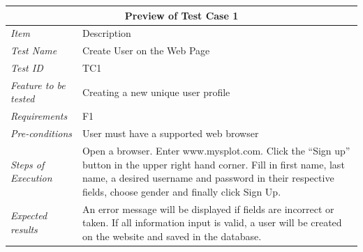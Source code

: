 %
\begin{minipage}{\linewidth}
\setlength{\tabcolsep}{15pt}
\centering
{}
\begin{tabular}{ |l|p{70mm}| }
	\hline
	\multicolumn{2}{|c|}{\cellcolor{gray!25} \textbf{Preview of Test Case 1}} \\
	\hline
	\it{\cellcolor{gray!25}Item} & {\cellcolor{gray!25} Description } \\
	\hline
	\it{\cellcolor{gray!25}Test Name } & Create User on the Web Page \\ \hline
	\it{\cellcolor{gray!25}Test ID} & TC1 \\ \hline
	\it{\cellcolor{gray!25}Feature to be tested} & Creating a new unique user profile \\ \hline
	\it{\cellcolor{gray!25}Requirements} & F1  \\ \hline
	\it{\cellcolor{gray!25}Pre-conditions} & User must have a supported web browser  \\ \hline
	\it{\cellcolor{gray!25}Steps of Execution} & Open a browser. Enter www.mysplot.com. Click the ``Sign up'' button in the upper right hand corner. Fill in first name, last name, a desired username and password in their respective fields, choose gender and finally click Sign Up. \\ \hline
	\it{\cellcolor{gray!25}Expected results} & An error message will be displayed if fields are incorrect or taken. If all information input is valid, a user will be created on the website and saved in the database.  \\
	\hline
\end{tabular}
\medskip
\end{minipage}
%
